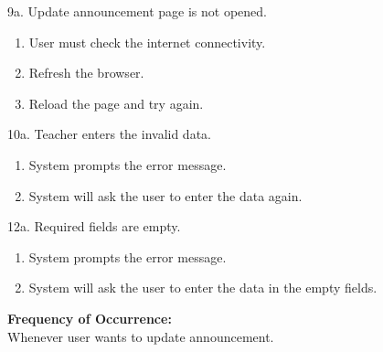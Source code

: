 \documentclass[12pt]{article}
\begin{document}
9a. Update announcement page is not opened.
\begin{enumerate}
\item User must check the internet connectivity.
\item Refresh the browser.
\item Reload the page and try again.
\end{enumerate}
10a. Teacher enters the invalid data.
\begin{enumerate}
\item System prompts the error message.
\item System will ask the user to enter the data again.
\end{enumerate}
12a. Required fields are empty.
\begin{enumerate}
\item System prompts the error message.
\item System will ask the user to enter the data in the empty fields.
\end{enumerate}
\textbf{Frequency of Occurrence:}\\
Whenever user wants to update announcement.
\end{document}
